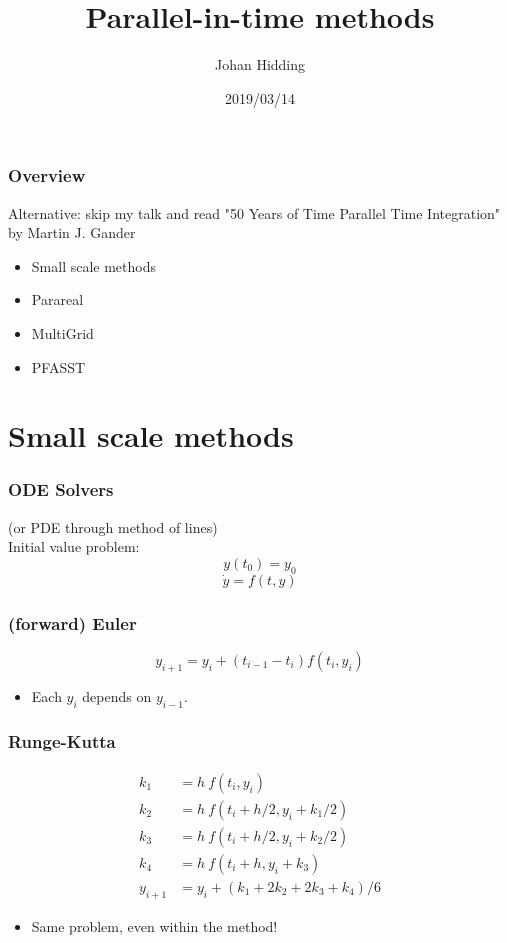 \documentclass[aspectratio=169]{beamer}
\title{Parallel-in-time methods}
\author{Johan Hidding}
\date{2019/03/14}
\begin{document}
    \frame{\titlepage}

    \begin{frame}
        \frametitle{Overview}
        Alternative: skip my talk and read "50 Years of Time Parallel Time Integration" by Martin J. Gander \vspace{20pt}
        \begin{itemize}
            \item Small scale methods
            \item Parareal
            \item MultiGrid
            \item PFASST
        \end{itemize}
    \end{frame}

    \section{Small scale methods}
    \begin{frame}
        \frametitle{ODE Solvers}
        (or PDE through method of lines) \\ \vspace{20pt}
        Initial value problem:
        \[y(t_0) = y_0\]
        \[\dot{y} = f(t, y)\]
    \end{frame}

    \begin{frame}
        \frametitle{(forward) Euler}
        \[y_{i+1} = y_{i} + (t_{i-1} - t_{i}) f(t_{i}, y_{i})\]
        \begin{itemize}
            \item Each $y_i$ depends on $y_{i-1}$.
        \end{itemize}
    \end{frame}

    \begin{frame} 
        \frametitle{Runge-Kutta}
        \[\begin{aligned}
            k_1 &= h\ f(t_i, y_i)\\
            k_2 &= h\ f(t_i + h/2, y_i + k_1/2)\\
            k_3 &= h\ f(t_i + h/2, y_i + k_2/2)\\
            k_4 &= h\ f(t_i + h, y_i + k_3)\\
            y_{i+1} &= y_i + (k_1 + 2k_2 + 2k_3 + k_4)/6
        \end{aligned}\]
        \begin{itemize}
            \item Same problem, even within the method!
        \end{itemize}
    \end{frame}
\end{document}
